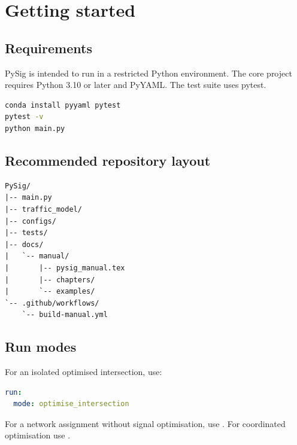 \chapter{Getting started}
\section{Requirements}
PySig is intended to run in a restricted Python environment. The core project requires Python 3.10 or later and PyYAML. The test suite uses pytest.
\begin{lstlisting}[language=bash]
conda install pyyaml pytest
pytest -v
python main.py
\end{lstlisting}

\section{Recommended repository layout}
\begin{lstlisting}
PySig/
|-- main.py
|-- traffic_model/
|-- configs/
|-- tests/
|-- docs/
|   `-- manual/
|       |-- pysig_manual.tex
|       |-- chapters/
|       `-- examples/
`-- .github/workflows/
    `-- build-manual.yml
\end{lstlisting}

\section{Run modes}
For an isolated optimised intersection, use:
\begin{lstlisting}[language=yaml]
run:
  mode: optimise_intersection
\end{lstlisting}
For a network assignment without signal optimisation, use . For coordinated optimisation use .
